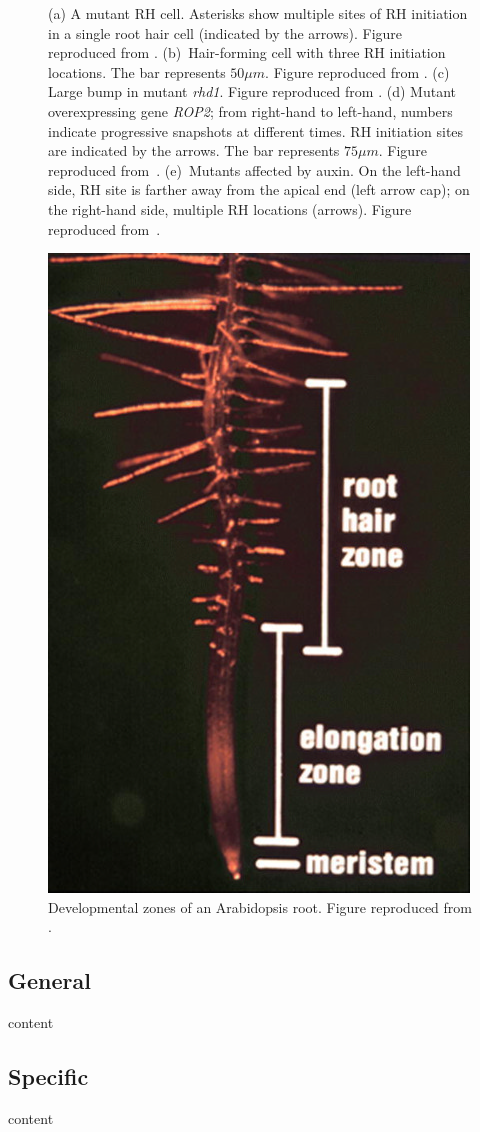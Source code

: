 \begin{figure}[t!]
\caption[Hair-forming mutant cells.]{(a) A mutant RH cell. Asterisks show multiple sites of RH initiation in a single root hair cell (indicated by the arrows). Figure reproduced from \cite{rigas01}. (b)~Hair-forming cell with three RH initiation locations. The bar represents $50\mu m$. Figure reproduced from \cite{massuci01}. (c) Large bump in mutant {\itshape rhd1}. Figure reproduced from \cite{griersonRH}. (d) Mutant overexpressing gene {\itshape ROP2}; from right-hand to left-hand, numbers indicate progressive snapshots at different times. RH initiation sites are indicated by the arrows. The bar represents $75\mu m$. Figure reproduced from~\cite{mjones01}. (e)~Mutants affected by auxin. On the left-hand side, RH site is farther away from the apical end (left arrow cap); on the right-hand side, multiple RH locations (arrows). Figure reproduced from~\cite{payne01}.}
\label{fig:multiRH02_alt}
\end{figure}

\begin{figure}[t!]
	\centering
	\includegraphics[height=0.35\textheight]{fig01/devepzones}
	\caption[Developmental zones of an Arabidopsis root.]{Developmental zones of an Arabidopsis root. Figure reproduced from \cite{griersonRH}.}
	\label{fig:RHP02}
\end{figure}

\subsection{General}
\label{subsec:subsec01}

content

\subsection{Specific}
\label{subsec:subsec01}

content

